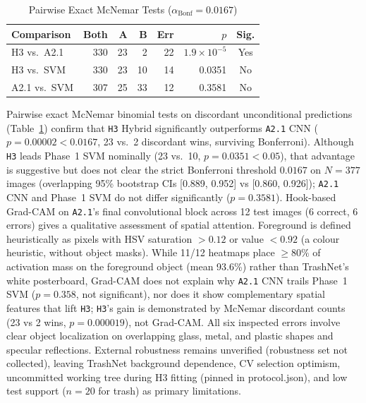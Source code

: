 \begin{table}[t]
\caption{Pairwise Exact McNemar Tests ($\alpha_{\mathrm{Bonf}}=0.0167$)}
\label{tab:phase2_mcnemar}
\centering
\footnotesize
\setlength{\tabcolsep}{3pt}
\begin{tabular}{lrrrrrc}
\toprule
Comparison & Both & A & B & Err & $p$ & Sig.\\
\midrule
H3 vs.\ A2.1 & 330 & 23 & 2 & 22 & $1.9{\times}10^{-5}$ & Yes\\
H3 vs.\ SVM & 330 & 23 & 10 & 14 & 0.0351 & No\\
A2.1 vs.\ SVM & 307 & 25 & 33 & 12 & 0.3581 & No\\
\bottomrule
\end{tabular}
\end{table}

Pairwise exact McNemar binomial tests on discordant unconditional predictions (Table~\ref{tab:phase2_mcnemar}) confirm that \texttt{H3} Hybrid significantly outperforms \texttt{A2.1} CNN ($p=0.00002 < 0.0167$, 23 vs.\ 2 discordant wins, surviving Bonferroni). Although \texttt{H3} leads Phase~1 SVM nominally (23 vs.\ 10, $p=0.0351 < 0.05$), that advantage is suggestive but does not clear the strict Bonferroni threshold $0.0167$ on $N=377$ images (overlapping 95\% bootstrap CIs [0.889, 0.952] vs [0.860, 0.926]); \texttt{A2.1} CNN and Phase~1 SVM do not differ significantly ($p=0.3581$). Hook-based Grad-CAM on \texttt{A2.1}'s final convolutional block across 12 test images (6 correct, 6 errors) gives a qualitative assessment of spatial attention. Foreground is defined heuristically as pixels with HSV saturation $> 0.12$ or value $< 0.92$ (a colour heuristic, without object masks). While 11/12 heatmaps place $\ge 80\%$ of activation mass on the foreground object (mean 93.6\%) rather than TrashNet's white posterboard, Grad-CAM does not explain why \texttt{A2.1} CNN trails Phase~1 SVM ($p=0.358$, not significant), nor does it show complementary spatial features that lift \texttt{H3}; \texttt{H3}'s gain is demonstrated by McNemar discordant counts (23 vs 2 wins, $p=0.000019$), not Grad-CAM. All six inspected errors involve clear object localization on overlapping glass, metal, and plastic shapes and specular reflections. External robustness remains unverified (robustness set not collected), leaving TrashNet background dependence, CV selection optimism, uncommitted working tree during H3 fitting (pinned in protocol.json), and low test support ($n=20$ for trash) as primary limitations.
